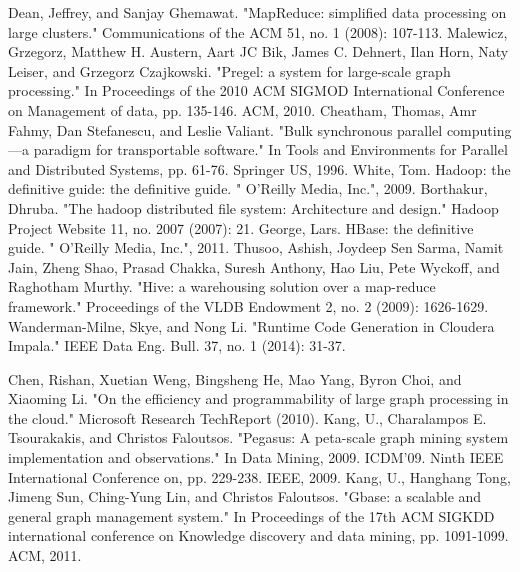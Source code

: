 \documentclass[conference]{IEEEtran}
\begin{document}
%
%
%
\begin{thebibliography}{1}
Dean, Jeffrey, and Sanjay Ghemawat. "MapReduce: simplified data processing on large clusters." Communications of the ACM 51, no. 1 (2008): 107-113.
Malewicz, Grzegorz, Matthew H. Austern, Aart JC Bik, James C. Dehnert, Ilan Horn, Naty Leiser, and Grzegorz Czajkowski. "Pregel: a system for large-scale graph processing." In Proceedings of the 2010 ACM SIGMOD International Conference on Management of data, pp. 135-146. ACM, 2010.
Cheatham, Thomas, Amr Fahmy, Dan Stefanescu, and Leslie Valiant. "Bulk synchronous parallel computing—a paradigm for transportable software." In Tools and Environments for Parallel and Distributed Systems, pp. 61-76. Springer US, 1996.
White, Tom. Hadoop: the definitive guide: the definitive guide. " O'Reilly Media, Inc.", 2009.
Borthakur, Dhruba. "The hadoop distributed file system: Architecture and design." Hadoop Project Website 11, no. 2007 (2007): 21.
George, Lars. HBase: the definitive guide. " O'Reilly Media, Inc.", 2011.
Thusoo, Ashish, Joydeep Sen Sarma, Namit Jain, Zheng Shao, Prasad Chakka, Suresh Anthony, Hao Liu, Pete Wyckoff, and Raghotham Murthy. "Hive: a warehousing solution over a map-reduce framework." Proceedings of the VLDB Endowment 2, no. 2 (2009): 1626-1629.
Wanderman-Milne, Skye, and Nong Li. "Runtime Code Generation in Cloudera Impala." IEEE Data Eng. Bull. 37, no. 1 (2014): 31-37.

Chen, Rishan, Xuetian Weng, Bingsheng He, Mao Yang, Byron Choi, and Xiaoming Li. "On the efficiency and programmability of large graph processing in the cloud." Microsoft Research TechReport (2010).
Kang, U., Charalampos E. Tsourakakis, and Christos Faloutsos. "Pegasus: A peta-scale graph mining system implementation and observations." In Data Mining, 2009. ICDM'09. Ninth IEEE International Conference on, pp. 229-238. IEEE, 2009.
Kang, U., Hanghang Tong, Jimeng Sun, Ching-Yung Lin, and Christos Faloutsos. "Gbase: a scalable and general graph management system." In Proceedings of the 17th ACM SIGKDD international conference on Knowledge discovery and data mining, pp. 1091-1099. ACM, 2011.


\end{thebibliography}
\end{document}
